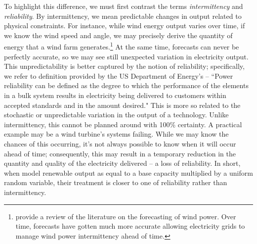 \documentclass[11pt,a4paper]{extarticle}
\begin{document}
To highlight this difference, we must first contrast the terms  \textit{intermittency} and \textit{reliability}. By intermittency, we mean predictable changes in output related to physical constraints. For instance, while wind energy output varies over time, if  we know the wind speed and angle, we may precisely derive the quantity of energy that a wind farm generates.\footnote{ \citet{Foley2012} provide a review of the literature on the forecasting of wind power. Over time, forecasts have gotten much more accurate allowing electricity grids to manage wind power intermittency ahead of time.}  At the same time, forecasts can never be perfectly accurate, so we may see still unexpected variation in  electricity output. This unpredictability is better captured by the notion of reliability; specifically,  we refer to definition provided by the US Department of Energy's \citet{ORNL} -- ``Power reliability can be defined as the degree to which the performance of the elements in a bulk system results in electricity being delivered to customers within accepted standards and in the amount desired." This is more so related to the stochastic or unpredictable variation in the output of a technology. Unlike intermittency, this cannot be planned around with 100\% certainty. A practical example may be a wind turbine's systems failing. While we may know the chances of this occurring, it's not always possible to know when it will occur ahead of time; consequently, this may result in a temporary reduction in the quantity and quality of the electricity delivered --  a loss of reliability. In short, when \citeauthor{HH} model renewable output as equal to a base capacity multiplied by a uniform random variable, their treatment is closer to one of reliability rather than intermittency. 
\end{document}
